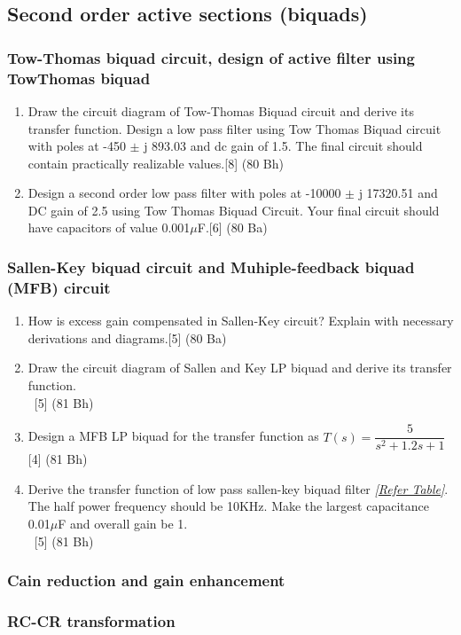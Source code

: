 \documentclass[12pt]{article}
\newcommand{\enter}{\\\textcolor{white}{1}}
\begin{document}
\subsection{Second order active sections (biquads)}
\subsubsection{Tow-Thomas biquad circuit, design of active filter using TowThomas biquad}
\begin{enumerate}
\item Draw the circuit diagram of Tow-Thomas Biquad circuit and derive its transfer function. Design a low pass filter using Tow Thomas Biquad circuit with poles at -450 $\pm$ j 893.03 and dc gain of 1.5. The final circuit should contain practically realizable values.\hfill [8] (80 Bh)
\item Design a second order low pass filter with poles at -10000 $\pm$ j 17320.51 and DC gain of 2.5 using Tow Thomas Biquad Circuit. Your final circuit should have capacitors of value 0.001$\mu$F.\hfill [6] (80 Ba)
\end{enumerate}
\subsubsection{Sallen-Key biquad circuit and Muhiple-feedback biquad (MFB) circuit}
\begin{enumerate}
\item How is excess gain compensated in Sallen-Key circuit? Explain with necessary derivations and diagrams.\hfill[5] (80 Ba)
\item Draw the circuit diagram of Sallen and Key LP biquad and derive its transfer function.
\enter\hfill [5] (81 Bh)
\item Design a MFB LP biquad for the transfer function as $T(s) = \dfrac{5}{s^2+1.2s+1}$ \hfill [4] (81 Bh)
\item Derive the transfer function of low pass sallen-key biquad filter \textit{[\hyperref[sec:tables_81ba]{Refer Table]}}. The half power frequency should be 10KHz. Make the largest capacitance 0.01$\mu$F and overall gain be 1.
\enter \hfill [5] (81 Bh)
\end{enumerate}
\subsubsection{Cain reduction and gain enhancement}
\subsubsection{RC-CR transformation}
\end{document}
